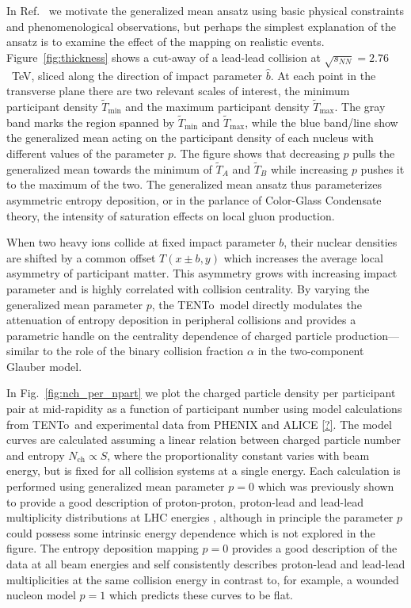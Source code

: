 \documentclass[aps,prc,reprint,amsmath,nofootinbib,superscriptaddress]{revtex4-1}
\newcommand{\trento}{T\raisebox{-0.5ex}{R}ENTo}
\newcommand{\nch}{N_\text{ch}}
\newcommand{\sqrts}{\sqrt{s_{NN}}}
\newcommand{\T}{\tilde{T}}
\begin{document}
In Ref.~\cite{Moreland:2014oya} we motivate the generalized mean ansatz using basic physical constraints and phenomenological observations, but perhaps the simplest explanation of the ansatz is to examine the effect of the mapping on realistic events.
Figure~\ref{fig:thickness} shows a cut-away of a lead-lead collision at $\sqrts=2.76$~TeV, sliced along the direction of impact parameter $\hat{b}$.
At each point in the transverse plane there are two relevant scales of interest, the minimum participant density $\T_\text{min}$ and the maximum participant density $\T_\text{max}$.
The gray band marks the region spanned by $\T_\text{min}$ and $\T_\text{max}$, while the blue band/line show the generalized mean acting on the participant density of each nucleus with different values of the parameter $p$.
The figure shows that decreasing $p$ pulls the generalized mean towards the minimum of $\T_A$ and $\T_B$ while increasing $p$ pushes it to the maximum of the two.
The generalized mean ansatz thus parameterizes asymmetric entropy deposition, or in the parlance of Color-Glass Condensate theory, the intensity of saturation effects on local gluon production.

When two heavy ions collide at fixed impact parameter $b$, their nuclear densities are shifted by a common offset $T(x\pm b,y)$ which increases the average local asymmetry of participant matter.
This asymmetry grows with increasing impact parameter and is highly correlated with collision centrality.
By varying the generalized mean parameter $p$, the \trento\ model directly modulates the attenuation of entropy deposition in peripheral collisions and provides a parametric handle on the centrality dependence of charged particle production---similar to the role of the binary collision fraction $\alpha$ in the two-component Glauber model.

In Fig.~\ref{fig:nch_per_npart} we plot the charged particle density per participant pair at mid-rapidity as a function of participant number using model calculations from \trento\ and experimental data from PHENIX and ALICE \ref{?}.
The model curves are calculated assuming a linear relation between charged particle number and entropy $\nch \propto S$, where the proportionality constant varies with beam energy, but is fixed for all collision systems at a single energy.
Each calculation is performed using generalized mean parameter $p=0$ which was previously shown to provide a good description of proton-proton, proton-lead and lead-lead multiplicity distributions at LHC energies \cite{Moreland:2014oya}, although in principle the parameter $p$ could possess some intrinsic energy dependence which is not explored in the figure.
The entropy deposition mapping $p=0$ provides a good description of the data at all beam energies and self consistently describes proton-lead and lead-lead multiplicities at the same collision energy in contrast to, for example, a wounded nucleon model $p=1$ which predicts these curves to be flat. 
\end{document}
